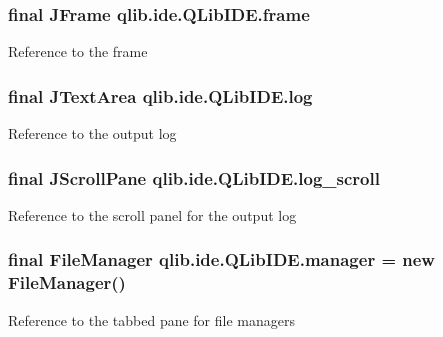 \subsubsection[{\texorpdfstring{frame}{frame}}]{\setlength{\rightskip}{0pt plus 5cm}final J\+Frame qlib.\+ide.\+Q\+Lib\+I\+D\+E.\+frame\hspace{0.3cm}{\ttfamily [private]}}\hypertarget{classqlib_1_1ide_1_1QLibIDE_a13a62cb428150031089c3824f16d6bef}{}\label{classqlib_1_1ide_1_1QLibIDE_a13a62cb428150031089c3824f16d6bef}
Reference to the frame 
\subsubsection[{\texorpdfstring{log}{log}}]{\setlength{\rightskip}{0pt plus 5cm}final J\+Text\+Area qlib.\+ide.\+Q\+Lib\+I\+D\+E.\+log\hspace{0.3cm}{\ttfamily [private]}}\hypertarget{classqlib_1_1ide_1_1QLibIDE_aa92d671c5f0158e59c86767109afc92c}{}\label{classqlib_1_1ide_1_1QLibIDE_aa92d671c5f0158e59c86767109afc92c}
Reference to the output log 
\subsubsection[{\texorpdfstring{log\+\_\+scroll}{log_scroll}}]{\setlength{\rightskip}{0pt plus 5cm}final J\+Scroll\+Pane qlib.\+ide.\+Q\+Lib\+I\+D\+E.\+log\+\_\+scroll\hspace{0.3cm}{\ttfamily [private]}}\hypertarget{classqlib_1_1ide_1_1QLibIDE_a74ee30733f7d424f2e518f1171d70917}{}\label{classqlib_1_1ide_1_1QLibIDE_a74ee30733f7d424f2e518f1171d70917}
Reference to the scroll panel for the output log 
\subsubsection[{\texorpdfstring{manager}{manager}}]{\setlength{\rightskip}{0pt plus 5cm}final {\bf File\+Manager} qlib.\+ide.\+Q\+Lib\+I\+D\+E.\+manager = new {\bf File\+Manager}()\hspace{0.3cm}{\ttfamily [private]}}\hypertarget{classqlib_1_1ide_1_1QLibIDE_a5af68fc042aeee1b69f27f3e1e67610b}{}\label{classqlib_1_1ide_1_1QLibIDE_a5af68fc042aeee1b69f27f3e1e67610b}
Reference to the tabbed pane for file managers 
